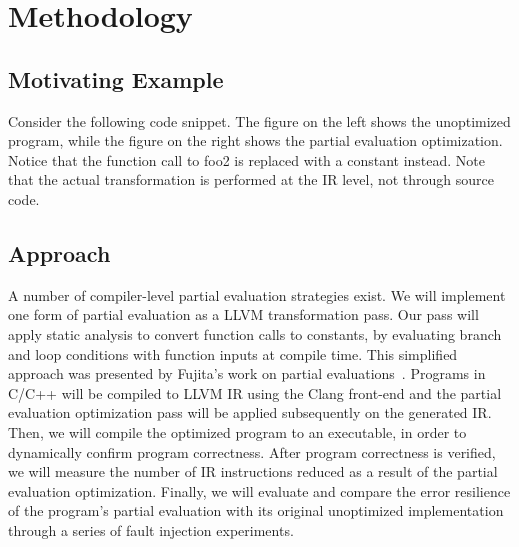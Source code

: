 \section{Methodology}
\label{sec:methodology}

\subsection{Motivating Example}
Consider the following code snippet.
The figure on the left shows the unoptimized program, while the figure on the right shows the partial evaluation optimization.
Notice that the function call to foo2 is replaced with a constant instead.
Note that the actual transformation is performed at the IR level, not through source code.

\subsection{Approach}
A number of compiler-level partial evaluation strategies exist.
We will implement one form of partial evaluation as a LLVM transformation pass.
Our pass will apply static analysis to convert function calls to constants, by evaluating branch and loop conditions with function inputs at compile time.
This simplified approach was presented by Fujita’s work on partial evaluations~\cite{Fujita}.
Programs in C/C++ will be compiled to LLVM IR using the Clang front-end and the partial evaluation optimization pass will be applied subsequently on the generated IR.
Then, we will compile the optimized program to an executable, in order to dynamically confirm program correctness.
After program correctness is verified, we will measure the number of IR instructions reduced as a result of the partial evaluation optimization.
Finally, we will evaluate and compare the error resilience of the program’s partial evaluation with its original unoptimized implementation through a series of fault injection experiments.
